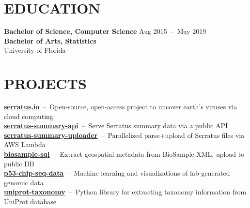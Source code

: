 \documentclass[line,resmargin]{res}
\begin{document}
\begin{resume}
\section{EDUCATION}
    \textbf{Bachelor of Science, Computer Science}    \hfill Aug 2015~--~May 2019 \\
    \textbf{Bachelor of Arts, Statistics} \\
    University of Florida

\section{PROJECTS}
    \textbf{\href{https://serratus.io/}{serratus.io}}~--~Open-source, open-access project to uncover earth's viruses via cloud computing \\
    \textbf{\href{https://github.com/serratus-bio/serratus-summary-api}{serratus-summary-api}}~--~Serve Serratus summary data via a public API \\
    \textbf{\href{https://github.com/serratus-bio/serratus-summary-uploader}{serratus-summary-uploader}}~--~Parallelized parse+upload of Serratus files via AWS Lambda \\
    \textbf{\href{https://github.com/serratus-bio/biosample-sql}{biosample-sql}}~--~Extract geospatial metadata from BioSample XML, upload to public DB \\
    \textbf{\href{https://github.com/zhoulab/p53-chip-seq-data}{p53-chip-seq-data}}~--~Machine learning and visualizations of lab-generated genomic data \\
    \textbf{\href{https://github.com/zhoulab/uniprot-taxonomy}{uniprot-taxonomy}}~--~Python library for extracting taxonomy information from UniProt database \\



\end{resume}
\end{document}
